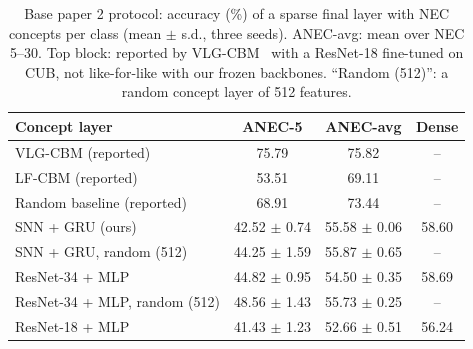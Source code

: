 \documentclass[conference]{IEEEtran}
\begin{document}
\begin{table}[t]
\caption{Base paper 2 protocol: accuracy (\%) of a sparse final layer with NEC concepts per class (mean $\pm$ s.d., three seeds). ANEC-avg: mean over NEC 5--30. Top block: reported by VLG-CBM~\cite{srivastava2024vlgcbm} with a ResNet-18 fine-tuned on CUB, not like-for-like with our frozen backbones. ``Random (512)'': a random concept layer of 512 features.}
\label{tab:nec}
\centering
\footnotesize
\setlength{\tabcolsep}{3pt}
\begin{tabular}{@{}lccc@{}}
\toprule
Concept layer & ANEC-5 & ANEC-avg & Dense \\
\midrule
VLG-CBM (reported) & 75.79 & 75.82 & -- \\
LF-CBM (reported) & 53.51 & 69.11 & -- \\
Random baseline (reported) & 68.91 & 73.44 & -- \\
\midrule
SNN + GRU (ours) & 42.52 $\pm$ 0.74 & 55.58 $\pm$ 0.06 & 58.60 \\
SNN + GRU, random (512) & 44.25 $\pm$ 1.59 & 55.87 $\pm$ 0.65 & -- \\
ResNet-34 + MLP & 44.82 $\pm$ 0.95 & 54.50 $\pm$ 0.35 & 58.69 \\
ResNet-34 + MLP, random (512) & 48.56 $\pm$ 1.43 & 55.73 $\pm$ 0.25 & -- \\
ResNet-18 + MLP & 41.43 $\pm$ 1.23 & 52.66 $\pm$ 0.51 & 56.24 \\
\bottomrule
\end{tabular}
\end{table}
\end{document}
